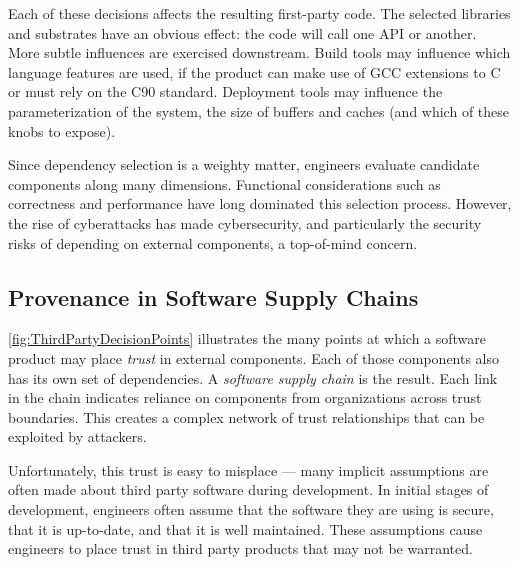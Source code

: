\documentclass{IEEEcsmagTechrxiv}
\begin{document}
Each of these decisions affects the resulting first-party code.
The selected libraries and substrates have an obvious effect: the code will call one API or another.
More subtle influences are exercised downstream.
Build tools may influence which language features are used, \eg if the product can make use of GCC extensions to C or must rely on the C90 standard.
Deployment tools may influence the parameterization of the system, \eg the size of buffers and caches (and which of these knobs to expose).

Since dependency selection is a weighty matter, engineers evaluate candidate components along many dimensions.
Functional considerations such as correctness and performance have long dominated this selection process.
However, the rise of cyberattacks has made cybersecurity, and particularly the security risks of depending on external components, a top-of-mind concern. %

\subsection{Provenance in Software Supply Chains}

\iffalse
	\cref{fig:ThirdPartyDecisionPoints} illustrates the many points at which a software product may place \textit{trust} in external components.
	Each of those components also has its own set of dependencies.
	A \textit{software supply chain} is the result.
	Each link in the chain indicates reliance on components from organizations across trust boundaries.
	This creates a complex network of trust relationships that can be exploited by attackers.

	Unfortunately, this trust is easy to misplace --- many implicit assumptions are often made about third party software during development.
	In initial stages of development, engineers often assume that the software they are using is secure, that it is up-to-date, and that it is well maintained.
	These assumptions cause engineers to place trust in third party products that may not be warranted.
\end{document}
